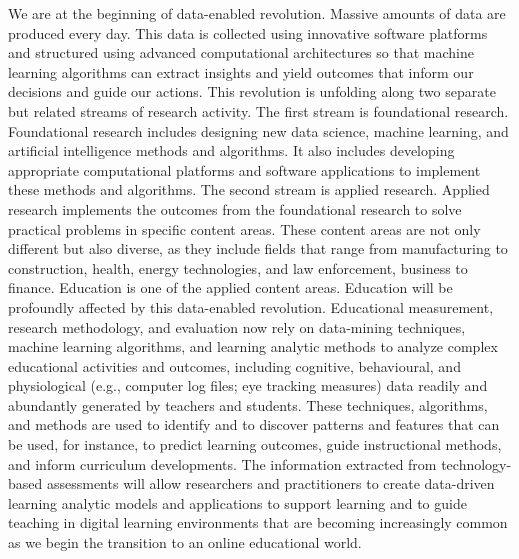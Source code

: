 \documentclass[
]{book}
\begin{document}
We are at the beginning of data-enabled revolution. Massive amounts of data are produced every day. This data is collected using innovative software platforms and structured using advanced computational architectures so that machine learning algorithms can extract insights and yield outcomes that inform our decisions and guide our actions. This revolution is unfolding along two separate but related streams of research activity. The first stream is foundational research. Foundational research includes designing new data science, machine learning, and artificial intelligence methods and algorithms. It also includes developing appropriate computational platforms and software applications to implement these methods and algorithms. The second stream is applied research. Applied research implements the outcomes from the foundational research to solve practical problems in specific content areas. These content areas are not only different but also diverse, as they include fields that range from manufacturing to construction, health, energy technologies, and law enforcement, business to finance. Education is one of the applied content areas. Education will be profoundly affected by this data-enabled revolution. Educational measurement, research methodology, and evaluation now rely on data-mining techniques, machine learning algorithms, and learning analytic methods to analyze complex educational activities and outcomes, including cognitive, behavioural, and physiological (e.g., computer log files; eye tracking measures) data readily and abundantly generated by teachers and students. These techniques, algorithms, and methods are used to identify and to discover patterns and features that can be used, for instance, to predict learning outcomes, guide instructional methods, and inform curriculum developments. The information extracted from technology-based assessments will allow researchers and practitioners to create data-driven learning analytic models and applications to support learning and to guide teaching in digital learning environments that are becoming increasingly common as we begin the transition to an online educational world.
\end{document}
